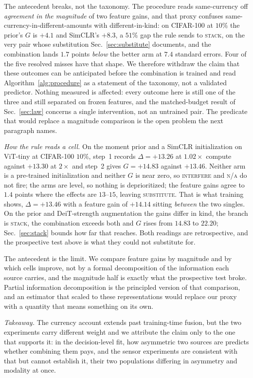  The antecedent breaks, not the taxonomy. The procedure reads
same-currency off \emph{agreement in the magnitude} of two feature gains, and
that proxy confuses same-currency-in-different-amounts with different-in-kind:
on CIFAR-100 at $10\%$ the prior's $G$ is $+4.1$ and SimCLR's $+8.3$, a $51\%$
gap the rule sends to \textsc{stack}, on the very pair whose substitution
Sec.~\ref{sec:substitute} documents, and the combination lands $1.7$ points
\emph{below} the better arm at $7.4$ standard errors. Four of the five
resolved misses have that shape. We therefore withdraw the claim that these
outcomes can be anticipated before the combination is trained and read
Algorithm~\ref{alg:procedure} as a statement of the taxonomy, not a validated
predictor. Nothing measured is affected: every outcome here is still one of
the three and still separated on frozen features, and the matched-budget
result of Sec.~\ref{sec:law} concerns a single intervention, not an untrained
pair. The predicate that would replace a magnitude comparison is the open
problem the next paragraph names.

\emph{How the rule reads a cell.}  On the moment prior and a
SimCLR initialization on ViT-tiny at CIFAR-100 $10\%$, step~1 records
$\Delta = +13.26$ at $1.02\times$ compute against $+13.30$ at $2\times$ and
step~2 gives $G = +14.83$ against $+13.46$. Neither arm is a pre-trained
initialization and neither $G$ is near zero, so \textsc{interfere} and
\textsc{n/a} do not fire; the arms are level, so nothing is deprioritized;
the feature gains agree to $1.4$ points where the effects are $13$--$15$,
leaving \textsc{substitute}. That is what training shows, $\Delta = +13.46$
with a feature gain of $+14.14$ sitting \emph{between} the two singles. On the
prior and DeiT-strength augmentation the gains differ in kind, the branch is
\textsc{stack}, the combination exceeds both and $G$ rises from $14.83$ to
$22.20$; Sec.~\ref{sec:stack} bounds how far that reaches. Both readings are
retrospective, and the prospective test above is what they could not
substitute for.

The antecedent is the limit. We compare feature gains by magnitude
and by which cells improve, not by a formal decomposition of the information
each source carries, and the magnitude half is exactly what the prospective
test broke. Partial information decomposition
\citep{williams2010nonnegative,liang2023quantifying} is the principled version
of that comparison, and an estimator that scaled to these representations would
replace our proxy with a quantity that means something on its own.

\emph{Takeaway.} The currency account extends past training-time fusion, but
the two experiments carry different weight and we attribute the claim only to
the one that supports it: in the decision-level fit, how asymmetric two
sources are predicts whether combining them pays, and the sensor experiments
are consistent with that but cannot establish it, their two populations
differing in asymmetry and modality at once.
